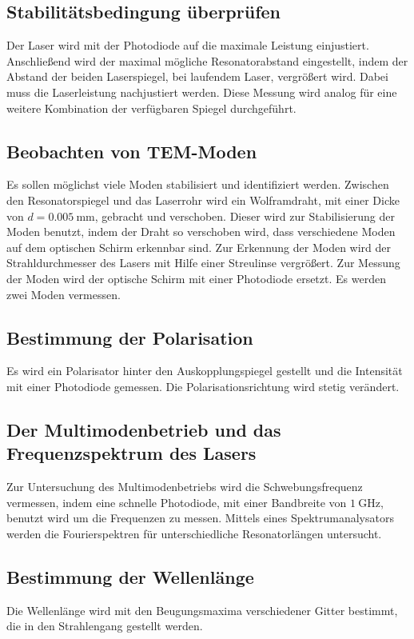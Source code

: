 \subsection{Stabilitätsbedingung überprüfen}
\label{subsec:Stabilitätsbedingung}
Der Laser wird mit der Photodiode auf die maximale Leistung einjustiert.
Anschließend wird der maximal mögliche Resonatorabstand eingestellt, indem der Abstand der beiden Laserspiegel, bei laufendem Laser, vergrößert wird.
Dabei muss die Laserleistung nachjustiert werden.
Diese Messung wird analog für eine weitere Kombination der verfügbaren Spiegel durchgeführt.

\subsection{Beobachten von TEM-Moden}
\label{subsec:Moden}
Es sollen möglichst viele Moden stabilisiert und identifiziert werden. Zwischen den Resonatorspiegel und das Laserrohr
wird ein Wolframdraht, mit einer Dicke von $d = \qty{0.005}{\milli\meter}$, gebracht und verschoben. Dieser wird zur Stabilisierung
der Moden benutzt, indem der Draht so verschoben wird, dass verschiedene Moden auf dem optischen Schirm erkennbar sind.
Zur Erkennung der Moden wird der Strahldurchmesser des Lasers mit Hilfe einer Streulinse vergrößert. Zur Messung der Moden wird der optische Schirm mit 
einer Photodiode ersetzt. Es werden zwei Moden vermessen.

\subsection{Bestimmung der Polarisation}
\label{subsec:Polarisation}
Es wird ein Polarisator hinter den Auskopplungspiegel gestellt und die Intensität mit einer Photodiode gemessen.
Die Polarisationsrichtung wird stetig verändert.

\subsection{Der Multimodenbetrieb und das Frequenzspektrum des Lasers}
\label{subsec:Multimodenbetrieb}
Zur Untersuchung des Multimodenbetriebs wird die Schwebungsfrequenz vermessen, indem eine schnelle Photodiode, mit einer Bandbreite
von $\qty{1}{\giga\Hz}$, benutzt wird um die Frequenzen zu messen. Mittels eines Spektrumanalysators werden die Fourierspektren für 
unterschiedliche Resonatorlängen untersucht.

\subsection{Bestimmung der Wellenlänge}
\label{subsec:Wellenlänge}
Die Wellenlänge wird mit den Beugungsmaxima verschiedener Gitter bestimmt, die in den Strahlengang gestellt werden.